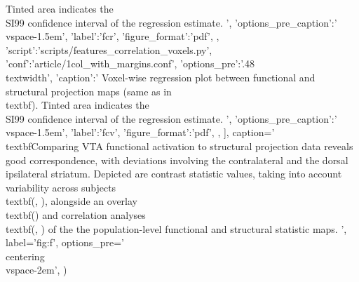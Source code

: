 \begin{sansmath}
{{                                Tinted area indicates the \\SI{99}{\percent} confidence interval of the regression estimate.
                                ',
                        'options_pre_caption':'\\vspace{-1.5em}',
                        'label':'fcr',
                        'figure_format':'pdf',
                        },
                {'script':'scripts/features_correlation_voxels.py', 'conf':'article/1col_with_margins.conf', 'options_pre':'{.48\\textwidth}',
                        'caption':'
                                Voxel-wise regression plot between functional and structural projection maps (same as in \\textbf{}).
                                Tinted area indicates the \\SI{99}{\percent} confidence interval of the regression estimate.
                                ',
                        'options_pre_caption':'\\vspace{-1.5em}',
                        'label':'fcv',
                        'figure_format':'pdf',
                        },
                ],
        caption='
                \\textbf{Comparing VTA functional activation to structural projection data reveals good correspondence, with deviations involving the contralateral and the dorsal ipsilateral striatum.}
                Depicted are contrast statistic values, taking into account variability across subjects \\textbf{(, )}, alongside an overlay \\textbf{()} and correlation analyses \\textbf{(, )} of the the population-level functional and structural statistic maps.
                ',
        label='fig:f',
        options_pre='\\centering\n\\vspace{-2em}',
        )}
\end{sansmath}

